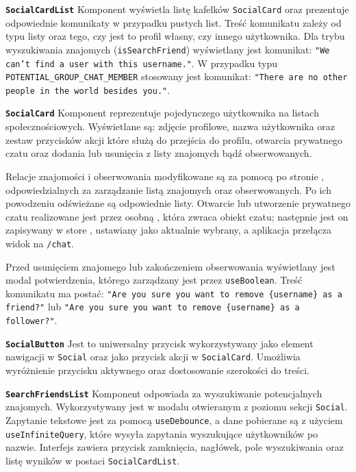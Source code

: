 \textbf{\texttt{SocialCardList}}
Komponent wyświetla listę kafelków \texttt{SocialCard} oraz prezentuje odpowiednie komunikaty w przypadku pustych list.
Treść komunikatu zależy od typu listy oraz tego, czy jest to profil własny, czy innego użytkownika.
Dla trybu wyszukiwania znajomych (\texttt{isSearchFriend}) wyświetlany jest komunikat:
\texttt{"We can't find a user with this username."}.
W przypadku typu \texttt{POTENTIAL\_GROUP\_CHAT\_MEMBER} stosowany jest komunikat:
\texttt{"There are no other people in the world besides you."}.

\textbf{\texttt{SocialCard}}
Komponent reprezentuje pojedynczego użytkownika na listach społecznościowych.
Wyświetlane są: zdjęcie profilowe, nazwa użytkownika oraz zestaw przycisków akcji które służą do przejścia do profilu,
otwarcia prywatnego czatu oraz dodania lub usunięcia z listy znajomych bądź obserwowanych.

Relacje znajomości i obserwowania modyfikowane są za pomocą  po stronie ,
odpowiedzialnych za zarządzanie listą znajomych oraz obserwowanych.
Po ich powodzeniu odświeżane są odpowiednie listy.
Otwarcie lub utworzenie prywatnego czatu realizowane jest przez osobną , która zwraca obiekt czatu; następnie
jest on zapisywany w store , ustawiany jako aktualnie wybrany, a aplikacja przełącza widok na \texttt{/chat}.

Przed usunięciem znajomego lub zakończeniem obserwowania wyświetlany jest modal potwierdzenia, którego  zarządzany
jest przez  \texttt{useBoolean}.
Treść komunikatu ma postać: \newline
\texttt{"Are you sure you want to remove \{username\} as a friend?"} lub \newline
\texttt{"Are you sure you want to remove \{username\} as a follower?"}.

\textbf{\texttt{SocialButton}}
Jest to uniwersalny przycisk wykorzystywany jako element nawigacji w \texttt{Social} oraz jako przycisk akcji w \texttt{SocialCard}.
Umożliwia wyróżnienie przycisku aktywnego oraz dostosowanie szerokości do treści.

\textbf{\texttt{SearchFriendsList}}
Komponent odpowiada za wyszukiwanie potencjalnych znajomych.
Wykorzystywany jest w modalu otwieranym z poziomu sekcji \texttt{Social}.
Zapytanie tekstowe jest  za pomocą  \texttt{useDebounce}, a dane
pobierane są z użyciem \texttt{useInfiniteQuery}, które wysyła zapytania wyszukujące użytkowników po nazwie.
Interfejs zawiera przycisk zamknięcia, nagłówek, pole wyszukiwania oraz listę wyników w postaci \texttt{SocialCardList}.

